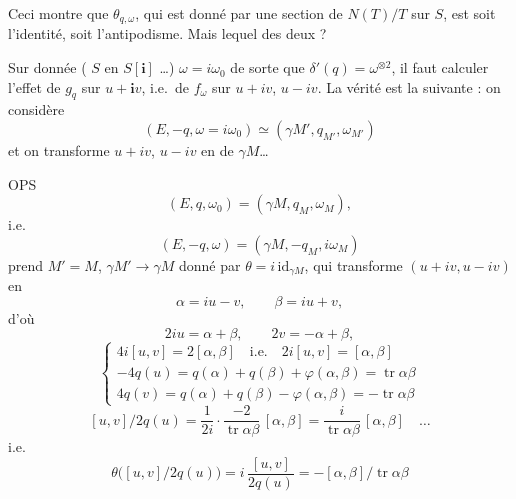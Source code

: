 \documentclass[11pt,a4paper]{article}
\begin{document}
Ceci montre que $\theta_{q,\omega}$, qui est donné par une section de $N(T)/T$ sur $S$, est soit l'identité, soit l'antipodisme. Mais lequel des deux ?

Sur  donnée ( $S$ en $S[\mathbf{i}]$ …) $\omega = i\omega_{0}$ de sorte que $\delta'(q) = \omega^{\otimes 2}$, il faut calculer l'effet de $g_{q}$ sur $u + \mathbf{i}v$, i.e.\ de $f_{\omega}$ sur $u + iv$, $u - iv$. La vérité est la suivante : on considère
\[
  (E, -q, \omega = i\omega_{0}) \simeq (\gamma M', q_{M'}, \omega_{M'})
\]
et on transforme $u + iv$, $u - iv$ en  de $\gamma M$…

OPS
\[
  (E, q, \omega_{0}) = (\gamma M, q_{M}, \omega_{M}),
\]
i.e.\
\[
  (E, -q, \omega) = (\gamma M, -q_{M}, i\omega_{M})
\]
 prend $M' = M$, $\gamma M' \to \gamma M$ donné par $\theta = i\,\mathrm{id}_{\gamma M}$, qui transforme $(u + iv, u - iv)$ en
\[
  \alpha = iu - v, \qquad \beta = iu + v,
\]
d'où
\[
  2iu = \alpha + \beta, \qquad 2v = -\alpha + \beta,
\]
\[
  \begin{cases}
    4i[u,v] = 2[\alpha,\beta] \quad \text{i.e.} \quad 2i[u,v] = [\alpha,\beta] \\
    -4q(u) = q(\alpha) + q(\beta) + \varphi(\alpha,\beta) = \operatorname{tr} \alpha\beta \\
    4q(v) = q(\alpha) + q(\beta) - \varphi(\alpha,\beta) = -\operatorname{tr} \alpha\beta
  \end{cases}
\]
\[
  [u,v]/2q(u) = \frac{1}{2i} \cdot \frac{-2}{\operatorname{tr} \alpha\beta}\,[\alpha,\beta]
  = \frac{i}{\operatorname{tr} \alpha\beta}\,[\alpha,\beta] \quad \ldots
\]
i.e.\
\[
  \theta\bigl([u,v]/2q(u)\bigr) = i\,\frac{[u,v]}{2q(u)} = -[\alpha,\beta]/\operatorname{tr} \alpha\beta
\]
\end{document}
